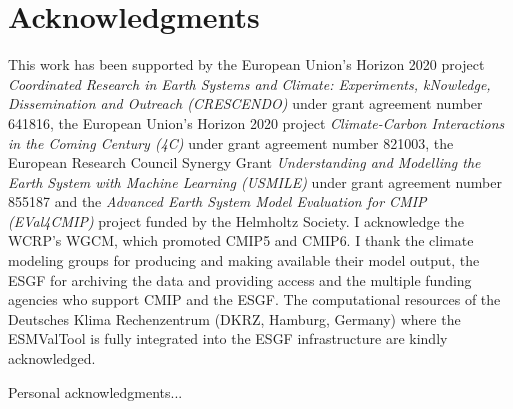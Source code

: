 
%



\chapter{Acknowledgments}

This work has been supported by the European Union's Horizon 2020 project
\emph{Coordinated Research in Earth Systems and Climate: Experiments,
  kNowledge, Dissemination and Outreach (CRESCENDO)} under grant agreement
number 641816, the European Union's Horizon 2020 project \emph{Climate-Carbon
  Interactions in the Coming Century (4C)} under grant agreement number 821003,
the European Research Council Synergy Grant \emph{Understanding and Modelling
  the Earth System with Machine Learning (USMILE)} under grant agreement number
855187 and the \emph{Advanced Earth System Model Evaluation for CMIP
  (EVal4CMIP)} project funded by the Helmholtz Society. I acknowledge the
\ac{WCRP}'s \ac{WGCM}, which promoted \acs{CMIP}5 and \acs{CMIP}6. I thank the
climate modeling groups for producing and making available their model output,
the \ac{ESGF} for archiving the data and providing access and the multiple
funding agencies who support \ac{CMIP} and the \ac{ESGF}. The computational
resources of the Deutsches Klima Rechenzentrum (DKRZ, Hamburg, Germany) where
the \ac{ESMValTool} is fully integrated into the \ac{ESGF} infrastructure are
kindly acknowledged.

Personal acknowledgments...
